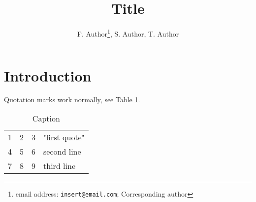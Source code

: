 \documentclass[12pt, letterpaper]{article}
\title{Title}
\author{F. Author\thanks{email address: \texttt{insert@email.com}; Corresponding author}, S. Author, T. Author}
\date{}
\newcommand{\beginsupplement}{%
        \setcounter{table}{0}
        \renewcommand{\thetable}{S\arabic{table}}%
        \setcounter{figure}{0}
        \renewcommand{\thefigure}{S\arabic{figure}}%
     }
\begin{document}
\maketitle

\begin{abstract}
    \noindent \lipsum[1]
\end{abstract}

\section{Introduction}

\lipsum[2]

Quotation marks work normally, see Table \ref{tab:example}.


\begin{table}[h]
    \centering
    \caption{Caption}
    \begin{tabular}{ l | c | r | p{3cm}}
        \hline			
        1 & 2 & 3 & "first quote" \\
        4 & 5 & 6 & second line \\
        7 & 8 & 9 & third line \\
        \hline  
    \end{tabular}
    \label{tab:example}
\end{table}


\iffalse

\begin{figure}
    \centering
    \texttt{[image: ]}
    \caption{Caption}
    \label{fig:example}
\end{figure}

\fi

\printbibliography

\beginsupplement

\end{document}
